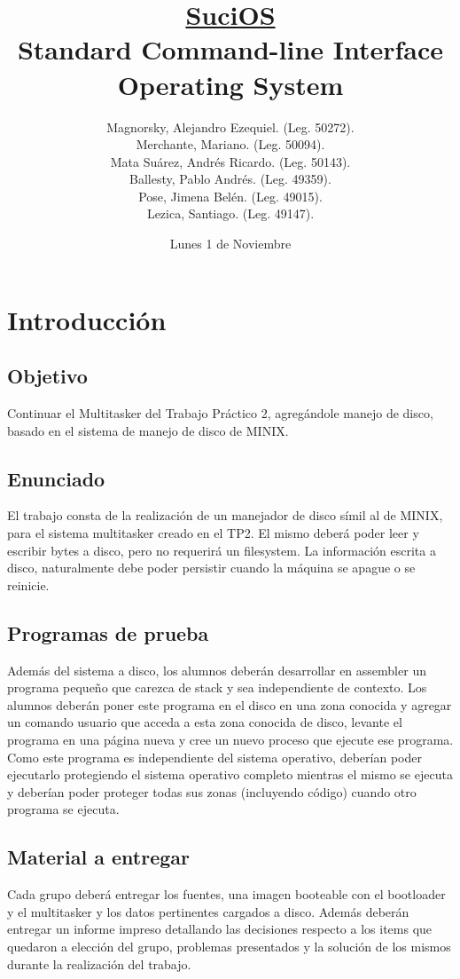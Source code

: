 \documentclass[a4paper,10pt]{article}
\title{\underline{\textbf{SuciOS}} \\ \small Standard Command-line Interface Operating System}
\author{
Magnorsky, Alejandro Ezequiel. (Leg. 50272). \\
Merchante, Mariano. (Leg. 50094).\\
Mata Suárez, Andrés Ricardo. (Leg. 50143). \\
Ballesty, Pablo Andrés. (Leg. 49359).\\
Pose, Jimena Belén. (Leg. 49015).\\
Lezica, Santiago. (Leg. 49147).\\
}
\date{Lunes 1 de Noviembre}
\begin{document}
\maketitle

\newpage
\tableofcontents

\newpage
\section{Introducción}
\subsection{Objetivo}
Continuar el Multitasker del Trabajo Práctico 2, agregándole manejo de disco,
basado en el sistema de manejo de disco de MINIX.


\subsection{Enunciado}
El trabajo consta de la realización de un manejador de disco símil al de MINIX,
para el sistema multitasker creado en el TP2. El mismo deberá poder leer y
escribir bytes a disco, pero no requerirá un filesystem. La información escrita
a disco, naturalmente debe poder persistir cuando la máquina se apague o se
reinicie.

\subsection{Programas de prueba}
Además del sistema a disco, los alumnos deberán desarrollar en assembler un
programa pequeño que carezca de stack y sea independiente de contexto. Los
alumnos deberán poner este programa en el disco en una zona conocida y agregar
un comando usuario que acceda a esta zona conocida de disco, levante
el programa en una página nueva y cree un nuevo proceso que ejecute ese programa. 
Como este programa es independiente del sistema operativo, deberían
poder ejecutarlo protegiendo el sistema operativo completo mientras el mismo
se ejecuta y deberían poder proteger todas sus zonas (incluyendo código) cuando
otro programa se ejecuta.


\subsection{Material a entregar}
Cada grupo deberá entregar los fuentes, una imagen booteable con el bootloader
y el multitasker y los datos pertinentes cargados a disco. Además deberán
entregar un informe impreso detallando las decisiones respecto a los items que
quedaron a elección del grupo, problemas presentados y la solución de los mismos
durante la realización del trabajo.
\end{document}
